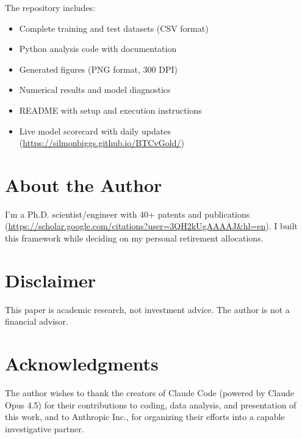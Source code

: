 \documentclass[11pt,letterpaper]{article}
\begin{document}
The repository includes:
\begin{itemize}
    \item Complete training and test datasets (CSV format)
    \item Python analysis code with documentation
    \item Generated figures (PNG format, 300 DPI)
    \item Numerical results and model diagnostics
    \item README with setup and execution instructions
    \item Live model scorecard with daily updates (\url{https://silmonbiggs.github.io/BTCvGold/})
\end{itemize}

\section*{About the Author}

I'm a Ph.D. scientist/engineer with 40+ patents and publications (\url{https://scholar.google.com/citations?user=3QH2kUgAAAAJ&hl=en}). I built this framework while deciding on my personal retirement allocations.

\section*{Disclaimer}

This paper is academic research, not investment advice. The author is not a financial advisor.

\section*{Acknowledgments}

The author wishes to thank the creators of Claude Code (powered by Claude Opus 4.5) for their contributions to coding, data analysis, and presentation of this work, and to Anthropic Inc., for organizing their efforts into a capable investigative partner.



\end{document}
